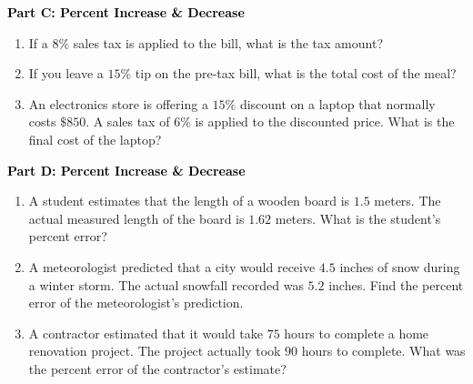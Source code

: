 \documentclass[12pt, letterpaper, fleqn]{article}
\begin{document}
\newpage

\begin{tcolorbox}[colback=customteal!20]
\large\textcolor{black}{\textbf{Part C: Percent Increase \& Decrease}}
\end{tcolorbox}

\vspace{3mm}

\begin{enumerate}[itemsep=5.5cm, leftmargin=0.6cm, resume]
\item If a $8\%$ sales tax is applied to the bill, what is the tax amount?
\item If you leave a $15\%$ tip on the pre-tax bill, what is the total cost of the meal?
\item An electronics store is offering a $15\%$ discount on a laptop that normally costs $\$850$. A sales tax of $6\%$ is applied to the discounted price. What is the final cost of the laptop?
\end{enumerate}

\newpage

\begin{tcolorbox}[colback=customteal!20]
\large\textcolor{black}{\textbf{Part D: Percent Increase \& Decrease}}
\end{tcolorbox}

\vspace{3mm}

\begin{enumerate}[itemsep=5.5cm, leftmargin=0.6cm, resume]
\item A student estimates that the length of a wooden board is $1.5$ meters. The actual measured length of the board is $1.62$ meters. What is the student's percent error?
\item A meteorologist predicted that a city would receive $4.5$ inches of snow during a winter storm. The actual snowfall recorded was $5.2$ inches. Find the percent error of the meteorologist's prediction.
\item A contractor estimated that it would take $75$ hours to complete a home renovation project. The project actually took $90$ hours to complete. What was the percent error of the contractor's estimate?
\end{enumerate}
\end{document}
